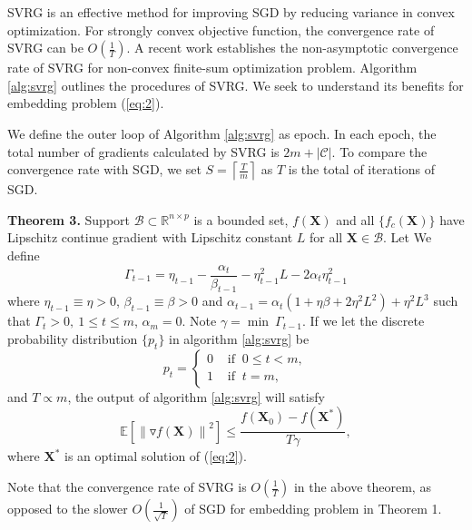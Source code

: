\documentclass[letterpaper]{article}
\begin{document}
		SVRG \cite{rie2013accelerating} is an effective method for improving SGD by reducing variance in convex optimization. For strongly convex objective function, the convergence rate of SVRG can be $O(\frac{1}{T})$. A recent work \cite{reddic2016nonconvex} establishes the non-asymptotic convergence rate of SVRG for non-convex finite-sum optimization problem. Algorithm \ref{alg:svrg} outlines the procedures of SVRG. We seek to understand its benefits for embedding problem (\ref{eq:2}).

		We define the outer loop of Algorithm \ref{alg:svrg} as epoch. In each epoch, the total number of gradients calculated by SVRG is $2m+|\mathcal{C}|$. To compare the convergence rate with SGD, we set $S = \left \lceil \frac{T}{m} \right \rceil$ as $T$ is the total of iterations of SGD.

		\textbf{Theorem 3.} Support $\mathcal{B}\subset\mathbb{R}^{n\times p}$ is a bounded set, $f(\mathbf{X})$ and all $\{f_c(\mathbf{X})\}$ have Lipschitz continue gradient with Lipschitz constant $L$ for all $\mathbf{X}\in\mathcal{B}$. Let We define
		$$
		\Gamma_{t-1} = \eta_{t-1}-\frac{\alpha_{t}}{\beta_{t-1}}-\eta^2_{t-1}L-2\alpha_{t}\eta^2_{t-1}
		$$
		where $\eta_{t-1}\equiv\eta>0$, $\beta_{t-1}\equiv\beta>0$ and $\alpha_{t-1}=\alpha_{t}(1+\eta\beta+2\eta^2L^2)+\eta^2L^3$ such that $\Gamma_t>0,\  1\leq t\leq m$, $\alpha_m=0$. Note $\gamma=\min\ \Gamma_{t-1}$. If we let the discrete probability distribution  $\{p_t\}$ in algorithm \ref{alg:svrg} be
		$$
		p_t=
		\begin{cases}
			0 & \text{ if }\ 0\leq t < m, \\
			1 & \text{ if }\ t = m,
		\end{cases}
		$$
		and $T\propto m$, the output of algorithm \ref{alg:svrg} will satisfy
		$$
			\mathbb{E}\left[\left\|\triangledown f(\mathbf{X})\right\|^2\right]\leq \frac{f(\mathbf{X}_0)-f(\mathbf{X}^*)}{T\gamma},
		$$
		where $\mathbf{X}^*$ is an optimal solution of (\ref{eq:2}).

		Note that the convergence rate of SVRG is $O(\frac{1}{T})$ in the above theorem, as opposed to the slower $O(\frac{1}{\sqrt{T}})$ of SGD for embedding problem in Theorem 1.
		
\end{document}
